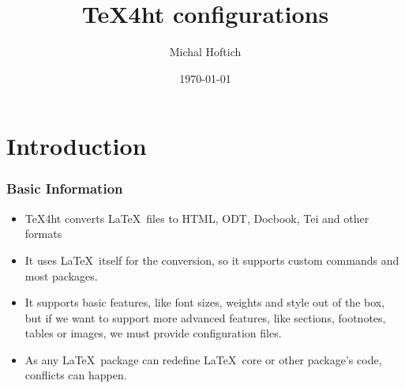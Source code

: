 \documentclass{beamer}
\title{\TeX4ht configurations}
\date{\today}
\author{Michal Hoftich}
\institute{Charles University, Faculty of Education, Library}
\begin{document}
  \maketitle
  \begin{frame}
  \tableofcontents
  \end{frame}
  \section{Introduction}
  \begin{frame}
   \frametitle{Basic Information}
    \begin{itemize}
      \item \TeX4ht converts \LaTeX\ files to HTML, ODT, Docbook, Tei and other formats
      \item It uses \LaTeX\ itself for the conversion, so it supports custom commands and most 
        packages.
      \item It supports basic features, like font sizes, weights and style out of the box, but if
        we want to support more advanced features, like sections, footnotes, tables or images, 
        we must provide configuration files.
      \item As any \LaTeX\ package can redefine \LaTeX\ core or other package's code, conflicts can 
        happen.
    \end{itemize}

  \end{frame}
\end{document}
